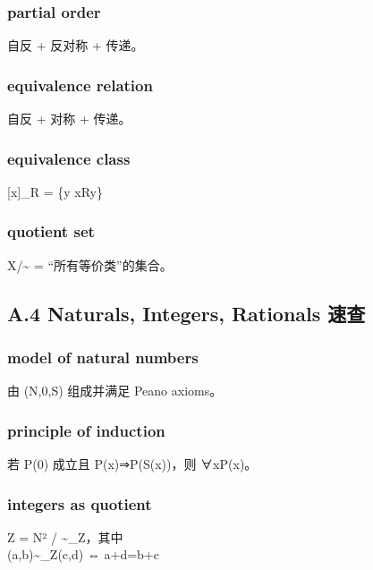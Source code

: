 \documentclass[
  11pt,
]{article}
\begin{document}
\subsubsection{partial order}\label{partial-order}

自反 + 反对称 + 传递。

\subsubsection{equivalence relation}\label{equivalence-relation}

自反 + 对称 + 传递。

\subsubsection{equivalence class}\label{equivalence-class}

{[}x{]}\_R = \{y \textbar{} xRy\}

\subsubsection{quotient set}\label{quotient-set}

X/\textasciitilde{} = ``所有等价类''的集合。

\subsection{A.4 Naturals, Integers, Rationals
速查}\label{a.4-naturals-integers-rationals-ux901fux67e5}

\subsubsection{model of natural numbers}\label{model-of-natural-numbers}

由 (N,0,S) 组成并满足 Peano axioms。

\subsubsection{principle of induction}\label{principle-of-induction}

若 P(0) 成立且 P(x)⇒P(S(x))，则 ∀xP(x)。

\subsubsection{integers as quotient}\label{integers-as-quotient}

Z = N² / \textasciitilde\_Z，其中\\
(a,b)\textasciitilde\_Z(c,d) ⇔ a+d=b+c
\end{document}
